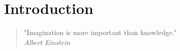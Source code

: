 
%

%



\chapter{Introduction}%
\label{cha:introduction}



%
\begin{quote}
\begin{flushright}
    "Imagination is more important than knowledge." \\
    \emph{Albert Einstein}
\end{flushright}
\end{quote}
  
